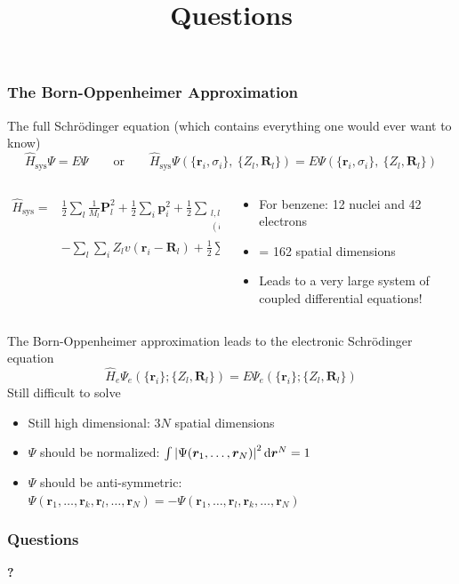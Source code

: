 \documentclass[t,aspectratio=169, 8pt]{beamer}
\def\*#1{\bm{#1}}
\begin{document}
\begin{frame}
	\frametitle{The Born-Oppenheimer Approximation}
	\small
	The full Schr\"odinger equation (which contains everything one would ever want to know)
	$$  \hat{H}_\text{sys} \Psi= E\Psi  \quad\quad \text{or} \quad\quad \hat{H}_\text{sys} \Psi(\{\mathbf{r}_i, \sigma_i\},\ \{Z_l,\*R_l\}) = E\Psi(\{\mathbf{r}_i, \sigma_i\},\ \{Z_l,\*R_l\})$$
	\begin{columns}[c]
		\begin{column}{0.45\textwidth}
			\footnotesize
			\begin{equation*} \label{FullHamiltonian}
				\begin{split}
					\hat{H}_\text{sys} =& \frac{1}{2}\sum_l \frac{1}{M_l}\*P_l^2 +  \frac{1}{2}\sum_i \*p_i^2 + \frac{1}{2}\sum_{\substack{l,l' \\(l \neq l')}} Z_lZ_{l'} v(\*R_l - \*R_{l'})\\
					&-\sum_l\sum_i Z_l v(\*r_i-\*R_l) + \frac{1}{2}\sum_{\substack{i,i' \\(i \neq i')}} v(\*r_i - \*r_{i'})
				\end{split}
			\end{equation*}
		\end{column}
		\begin{column}{0.5\textwidth}
			\begin{itemize}
				\item[] For benzene: 12 nuclei and 42 electrons
				\item[] = 162 spatial dimensions
				\item[] Leads to a very large system of coupled differential equations!
			\end{itemize}
		\end{column}
	\end{columns}
	The Born-Oppenheimer approximation leads to the electronic Schr\"odinger equation
	$$	\hat{H}_{e} \Psi_e(\{\mathbf{r}_i\}; \{Z_l,\*R_l\}) = E \Psi_e(\{\mathbf{r}_i\}; \{Z_l,\*R_l\})$$
	Still difficult to solve
	\begin{itemize}
		\item Still high dimensional: $3N$ spatial dimensions
		\item $\Psi$ should be normalized: $\int \abs{\Psi(\*r_1,\ldots,\*r_N)}^2 \dd{\*r^N} = 1$
		\item $\Psi$ should be anti-symmetric: $\Psi(\*r_1,\ldots,\*r_k, \*r_l ,\ldots,\*r_N) = - \Psi(\*r_1,\ldots,\*r_l ,\*r_k ,\ldots,\*r_N)$
	\end{itemize}
\end{frame}


\title{Questions}
\begin{chapterframe}
	\frametitle{Questions}
	\vspace{0.5cm}
	\begin{center}
		{\fontsize{60}{64} \selectfont \bfseries{?}}
	\end{center}
\end{chapterframe}
\end{document}
